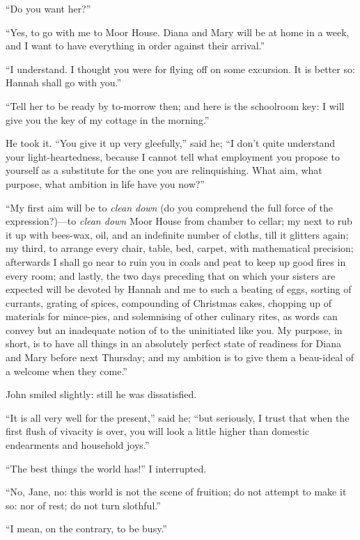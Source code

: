 \enquote{Do you want her?}

\enquote{Yes, to go with me to Moor House. Diana and Mary will be at
home in a week, and I want to have everything in order against their
arrival.}

\enquote{I understand. I thought you were for flying off on some
excursion. It is better so: Hannah shall go with you.}

\enquote{Tell her to be ready by to-morrow then; and here is the
schoolroom key: I will give you the key of my cottage in the morning.}

He took it. \enquote{You give it up very gleefully,} said he;
\enquote{I don't quite understand your light-heartedness, because I
cannot tell what employment you propose to yourself as a substitute for
the one you are relinquishing. What aim, what purpose, what ambition in
life have you now?}

\enquote{My first aim will be to \emph{clean down} (do you comprehend the full
force of the expression?)---to \emph{clean down} Moor House from chamber
to cellar; my next to rub it up with bees-wax, oil, and an indefinite
number of cloths, till it glitters again; my third, to arrange every
chair, table, bed, carpet, with mathematical precision; afterwards I
shall go near to ruin you in coals and peat to keep up good fires in
every room; and lastly, the two days preceding that on which your
sisters are expected will be devoted by Hannah and me to such a beating
of eggs, sorting of currants, grating of spices, compounding of
Christmas cakes, chopping up of materials for mince-pies, and
solemnising of other culinary rites, as words can convey but an
inadequate notion of to the uninitiated like you. My purpose, in short,
is to have all things in an absolutely perfect state of readiness for
Diana and Mary before next Thursday; and my ambition is to give them a
beau-ideal of a welcome when they come.}

\St{} John smiled slightly: still he was dissatisfied.

\enquote{It is all very well for the present,} said he; \enquote{but
seriously, I trust that when the first flush of vivacity is over, you
will look a little higher than domestic endearments and household joys.}

\enquote{The best things the world has!} I interrupted.

\enquote{No, Jane, no: this world is not the scene of fruition; do not
attempt to make it so: nor of rest; do not turn slothful.}

\enquote{I mean, on the contrary, to be busy.}

